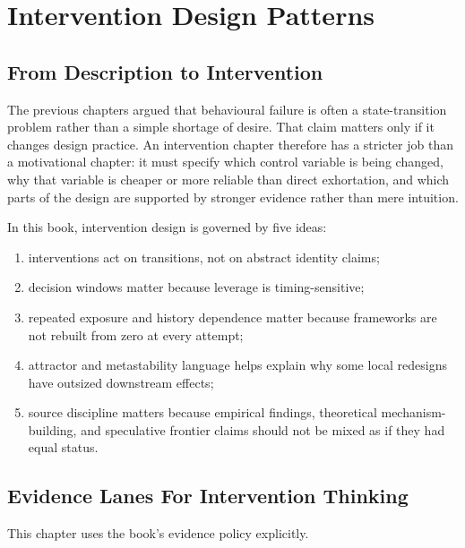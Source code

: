 \chapter{Intervention Design Patterns}
\label{ch:interventions}

\section{From Description to Intervention}

The previous chapters argued that behavioural failure is often a state-transition
problem rather than a simple shortage of desire. That claim matters only if it
changes design practice. An intervention chapter therefore has a stricter job
than a motivational chapter: it must specify which control variable is being
changed, why that variable is cheaper or more reliable than direct exhortation,
and which parts of the design are supported by stronger evidence rather than
mere intuition.

In this book, intervention design is governed by five ideas:
\begin{enumerate}[nosep]
  \item interventions act on transitions, not on abstract identity claims;
  \item decision windows matter because leverage is timing-sensitive;
  \item repeated exposure and history dependence matter because frameworks are
        not rebuilt from zero at every attempt;
  \item attractor and metastability language helps explain why some local
        redesigns have outsized downstream effects;
  \item source discipline matters because empirical findings, theoretical
        mechanism-building, and speculative frontier claims should not be mixed
        as if they had equal status.
\end{enumerate}

\section{Evidence Lanes For Intervention Thinking}

This chapter uses the book's evidence policy explicitly.

